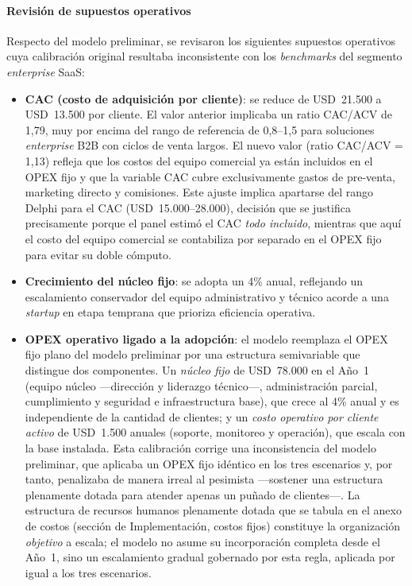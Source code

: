 \paragraph{Revisión de supuestos operativos}
Respecto del modelo preliminar, se revisaron los siguientes supuestos operativos cuya calibración original resultaba inconsistente con los \textit{benchmarks} del segmento \textit{enterprise} SaaS:

\begin{itemize}
    \item \textbf{CAC (costo de adquisición por cliente)}: se reduce de USD~21.500 a USD~13.500 por cliente. El valor anterior implicaba un ratio CAC/ACV de 1,79, muy por encima del rango de referencia de 0,8--1,5 para soluciones \textit{enterprise} B2B con ciclos de venta largos. El nuevo valor (ratio CAC/ACV = 1,13) refleja que los costos del equipo comercial ya están incluidos en el OPEX fijo y que la variable CAC cubre exclusivamente gastos de pre-venta, marketing directo y comisiones. Este ajuste implica apartarse del rango Delphi para el CAC (USD~15.000--28.000), decisión que se justifica precisamente porque el panel estimó el CAC \emph{todo incluido}, mientras que aquí el costo del equipo comercial se contabiliza por separado en el OPEX fijo para evitar su doble cómputo.
    \item \textbf{Crecimiento del núcleo fijo}: se adopta un 4\% anual, reflejando un escalamiento conservador del equipo administrativo y técnico acorde a una \textit{startup} en etapa temprana que prioriza eficiencia operativa.
    \item \textbf{OPEX operativo ligado a la adopción}: el modelo reemplaza el OPEX fijo plano del modelo preliminar por una estructura semivariable que distingue dos componentes. Un \emph{núcleo fijo} de USD~78.000 en el Año~1 (equipo núcleo —dirección y liderazgo técnico—, administración parcial, cumplimiento y seguridad e infraestructura base), que crece al 4\% anual y es independiente de la cantidad de clientes; y un \emph{costo operativo por cliente activo} de USD~1.500 anuales (soporte, monitoreo y operación), que escala con la base instalada. Esta calibración corrige una inconsistencia del modelo preliminar, que aplicaba un OPEX fijo idéntico en los tres escenarios y, por tanto, penalizaba de manera irreal al pesimista —sostener una estructura plenamente dotada para atender apenas un puñado de clientes—. La estructura de recursos humanos plenamente dotada que se tabula en el anexo de costos (sección de Implementación, costos fijos) constituye la organización \emph{objetivo} a escala; el modelo no asume su incorporación completa desde el Año~1, sino un escalamiento gradual gobernado por esta regla, aplicada por igual a los tres escenarios.

\end{itemize}
